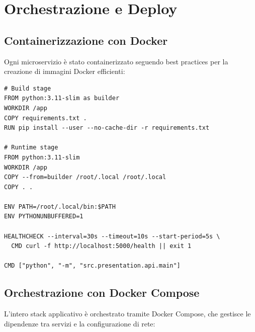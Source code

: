 \section{Orchestrazione e Deploy}
\label{sec:orchestration_deploy}

\subsection{Containerizzazione con Docker}
Ogni microservizio è stato containerizzato seguendo best practices per la creazione di immagini Docker efficienti:

\begin{listing}[H]
\begin{verbatim}
# Build stage
FROM python:3.11-slim as builder
WORKDIR /app
COPY requirements.txt .
RUN pip install --user --no-cache-dir -r requirements.txt

# Runtime stage
FROM python:3.11-slim
WORKDIR /app
COPY --from=builder /root/.local /root/.local
COPY . .

ENV PATH=/root/.local/bin:$PATH
ENV PYTHONUNBUFFERED=1

HEALTHCHECK --interval=30s --timeout=10s --start-period=5s \
  CMD curl -f http://localhost:5000/health || exit 1

CMD ["python", "-m", "src.presentation.api.main"]
\end{verbatim}
\caption{Dockerfile multi-stage per il servizio Analytics}
\label{listing:dockerfile-analytics}
\end{listing}

\subsection{Orchestrazione con Docker Compose}
L'intero stack applicativo è orchestrato tramite Docker Compose, che gestisce le dipendenze tra servizi e la configurazione di rete:

